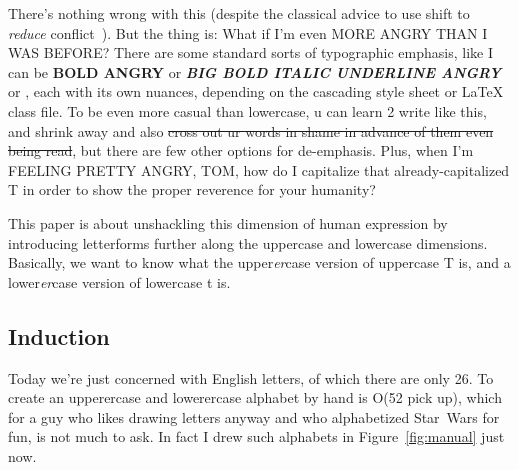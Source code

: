 \documentclass[twocolumn]{article}
\begin{document}
There's nothing wrong with this (despite the classical advice to use
shift to {\em reduce} conflict~\cite{aho1986compilers}). But the thing is:
What if I'm even MORE ANGRY THAN I WAS BEFORE? There are some standard
sorts of typographic emphasis, like I can be {\bf BOLD ANGRY} or
\textbf{\textit{\large BIG BOLD ITALIC UNDERLINE ANGRY}} or { \Large
  \textbf{\textit{}}}, each with
its own nuances, depending on the cascading style sheet or LaTeX class
file. To be even more casual than lowercase, u can learn 2 write like
this, and {\scriptsize shrink away} and also \sout{cross out ur words
  in shame in advance of them even being read}, but there are few
other options for de-emphasis. Plus, when I'm FEELING PRETTY ANGRY,
TOM, how do I capitalize that already-capitalized T in order to show
the proper reverence for your humanity?

This paper is about unshackling this dimension of human expression by
introducing letterforms further along the uppercase and lowercase
dimensions. Basically, we want to know what the upper{\it er}case
version of uppercase T is, and a lower{\it er}case version of
lowercase t is.

\subsection{Induction}

Today we're just concerned with English letters, of which there are
only 26. To create an upperercase and lowerercase alphabet by hand is
O(52 pick up), which for a guy who likes drawing letters anyway and
who alphabetized Star~Wars for fun, is not much to ask. In fact I
drew such alphabets in Figure~\ref{fig:manual} just now.
\end{document}
